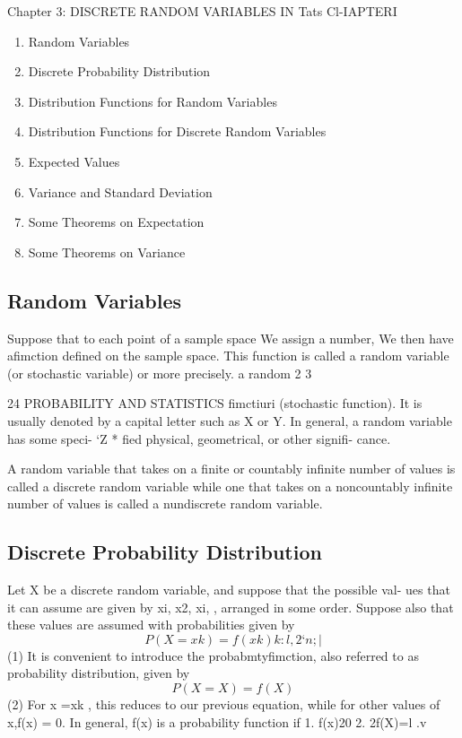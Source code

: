 
Chapter 3: DISCRETE RANDOM VARIABLES
IN Tats Cl-IAPTERI

\begin{enumerate}
\item Random Variables
\item Discrete Probability Distribution
\item Distribution Functions for
Random Variables
\item Distribution Functions for Discrete
Random Variables
\item Expected Values
\item Variance and Standard Deviation
\item Some Theorems on Expectation
\item Some Theorems on Variance
\end{enumerate}

\newpage
\subsection*{Random Variables}
Suppose that to each point of a sample space We assign a number, We
then have aﬁmction deﬁned on the sample space. This function is called
a random variable (or stochastic variable) or more precisely. a random
2 3



24 PROBABILITY AND STATISTICS
ﬁmctiuri (stochastic function). It is usually
denoted by a capital letter such as X or Y. In %
general, a random variable has some speci- ‘Z *
ﬁed physical, geometrical, or other signiﬁ-
cance.

A random variable that takes on a ﬁnite or countably inﬁnite number of values is
called a discrete random variable while one that takes on a noncountably inﬁnite number
of values is called a nundiscrete random variable.

\subsection*{Discrete Probability Distribution}
Let X be a discrete random variable, and suppose that the possible val-
ues that it can assume are given by xi, x2, xi,  , arranged in some order.
Suppose also that these values are assumed with probabilities given by
\[P(X=xk)=f(xk) k:l,2‘n;| \](1)
It is convenient to introduce the probabmtyfimction, also referred
to as probability distribution, given by
\[P(X=X)=f(X) \](2)
For x =xk , this reduces to our previous equation, while for other
values of x,f(x) = 0.
In general, f(x) is a probability function if
1. f(x)20
2. 2f(X)=l
.v



